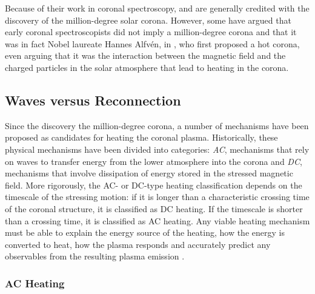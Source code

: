 Because of their work in coronal spectroscopy, \citet{grotrian_zur_1939} and \citet{edlen_deutung_1943} are generally credited with the discovery of the million-degree solar corona. However, some \citep[see][]{peter_discovery_2014} have argued that early coronal spectroscopists did not imply a million-degree corona and that it was in fact Nobel laureate Hannes Alfv\'{e}n, in \citet{alfven_solar_1941}, who first proposed a hot corona, even arguing that it was the interaction between the magnetic field and the charged particles in the solar atmosphere that lead to heating in the corona.

\subsection{Waves versus Reconnection}\label{sec:waves-reconnection}

Since the discovery the million-degree corona, a number of mechanisms have been proposed as candidates for heating the coronal plasma. Historically, these physical mechanisms have been divided into categories: \textit{AC}, mechanisms that rely on waves to transfer energy from the lower atmosphere into the corona and \textit{DC}, mechanisms that involve dissipation of energy stored in the stressed magnetic field. More rigorously, the AC- or DC-type heating classification depends on the timescale of the stressing motion: if it is longer than a characteristic crossing time of the coronal structure, it is classified as DC heating. If the timescale is shorter than a crossing time, it is classified as AC heating. Any viable heating mechanism must be able to explain the energy source of the heating, how the energy is converted to heat, how the plasma responds and accurately predict any observables from the resulting plasma emission \citep[see Figure 1 of][]{klimchuk_solving_2006}.

\subsubsection{AC Heating}\label{sec:ac-heating}

